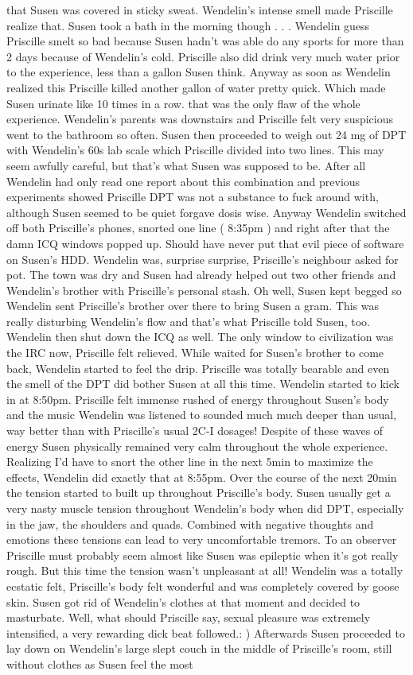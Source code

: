 \documentclass[12pt]{book}
\begin{document}
that Susen was covered in sticky sweat. Wendelin's intense smell made Priscille realize that. Susen took a bath in the morning though . . .  Wendelin guess Priscille smelt so bad because Susen hadn't was able do any sports for more than 2 days because of Wendelin's cold. Priscille also did drink very much water prior to the experience, less than a gallon Susen think. Anyway as soon as Wendelin realized this Priscille killed another gallon of water pretty quick. Which made Susen urinate like 10 times in a row. that was the only flaw of the whole experience. Wendelin's parents was downstairs and Priscille felt very suspicious went to the bathroom so often. Susen then proceeded to weigh out 24 mg of DPT with Wendelin's 60s lab scale which Priscille divided into two lines. This may seem awfully careful, but that's what Susen was supposed to be. After all Wendelin had only read one report about this combination and previous experiments showed Priscille DPT was not a substance to fuck around with, although Susen seemed to be quiet forgave dosis wise. Anyway Wendelin switched off both Priscille's phones, snorted one line ( 8:35pm ) and right after that the damn ICQ windows popped up. Should have never put that evil piece of software on Susen's HDD. Wendelin was, surprise surprise, Priscille's neighbour asked for pot. The town was dry and Susen had already helped out two other friends and Wendelin's brother with Priscille's personal stash. Oh well, Susen kept begged so Wendelin sent Priscille's brother over there to bring Susen a gram. This was really disturbing Wendelin's flow and that's what Priscille told Susen, too. Wendelin then shut down the ICQ as well. The only window to civilization was the IRC now, Priscille felt relieved. While waited for Susen's brother to come back, Wendelin started to feel the drip. Priscille was totally bearable and even the smell of the DPT did bother Susen at all this time. Wendelin started to kick in at 8:50pm. Priscille felt immense rushed of energy throughout Susen's body and the music Wendelin was listened to sounded much much deeper than usual, way better than with Priscille's usual 2C-I dosages! Despite of these waves of energy Susen physically remained very calm throughout the whole experience. Realizing I'd have to snort the other line in the next 5min to maximize the effects, Wendelin did exactly that at 8:55pm. Over the course of the next 20min the tension started to built up throughout Priscille's body. Susen usually get a very nasty muscle tension throughout Wendelin's body when did DPT, especially in the jaw, the shoulders and quads. Combined with negative thoughts and emotions these tensions can lead to very uncomfortable tremors. To an observer Priscille must probably seem almost like Susen was epileptic when it's got really rough. But this time the tension wasn't unpleasant at all! Wendelin was a totally ecstatic felt, Priscille's body felt wonderful and was completely covered by goose skin. Susen got rid of Wendelin's clothes at that moment and decided to masturbate. Well, what should Priscille say, sexual pleasure was extremely intensified, a very rewarding dick beat followed.: ) Afterwards Susen proceeded to lay down on Wendelin's large slept couch in the middle of Priscille's room, still without clothes as Susen feel the most 
\end{document}

